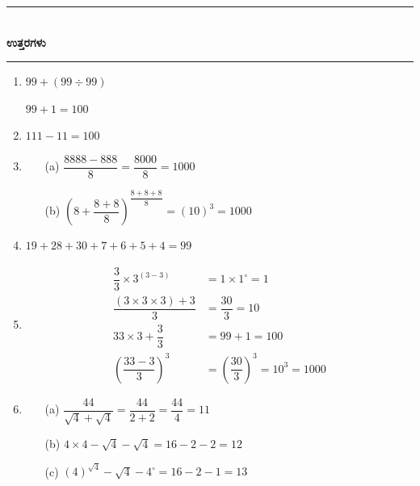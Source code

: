 \eject

\begin{center}
\rule{5cm}{1pt}\\[3pt]
{\Large\bfseries ಉತ್ತರಗಳು}\\[-0.1cm]
\rule{5cm}{1pt}
\end{center}

\begin{enumerate}
\itemsep=5pt

\item $99 + (99\div 99)$

$99 + 1 = 100$

\item $111 - 11 = 100$

\item 
\begin{itemize}
\item[(a)] $\dfrac{8888 - 888}{8} = \dfrac{8000}{8} = 1000$

\medskip

\item[(b)] $\left(8 + \dfrac{8+8}{8}\right)^{\dfrac{8+8+8}{8}} = (10)^{3} = 1000$
\end{itemize}

\item $19+28+30+7+6+5+4 = 99$

\smallskip

\item 
\begin{align*}
\dfrac{3}{3} \times 3^{(3-3)} & = 1\times 1^{\circ} = 1\\
\dfrac{(3\times 3\times 3) + 3}{3} & = \dfrac{30}{3} = 10\\
33\times 3 + \dfrac{3}{3} & = 99 + 1 = 100\\
\left(\dfrac{33-3}{3}\right)^{3} & = \left(\dfrac{30}{3}\right)^{3} = 10^{3} = 1000
\end{align*}

\item 
\begin{itemize}
\item[(a)] $\dfrac{44}{\sqrt{4} + \sqrt{4}} = \dfrac{44}{2+2} = \dfrac{44}{4} = 11$

\smallskip

\item[(b)] $4\times 4 - \sqrt{4} - \sqrt{4} = 16 - 2 - 2 = 12$

\smallskip

\item[(c)] $(4)^{\sqrt{4}} - \sqrt{4} - 4^{\circ} = 16 - 2 - 1 = 13$


\end{itemize}
\end{enumerate}
